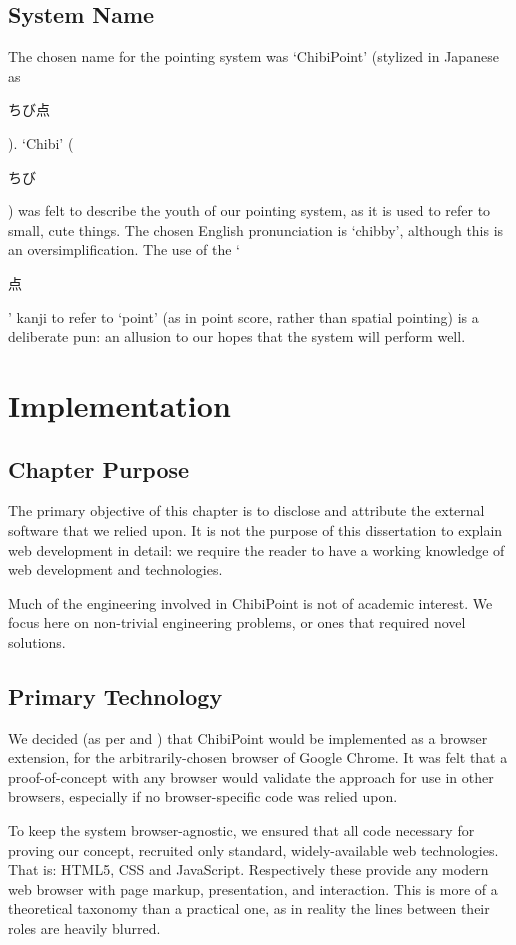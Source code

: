 \documentclass[11pt,openright,a4paper]{report}
\begin{document}
\section{System Name}
The chosen name for the pointing system was `ChibiPoint' (stylized in Japanese as \begin{CJK}{UTF8}{min}ちび点\end{CJK}). `Chibi' (\begin{CJK}{UTF8}{min}ちび\end{CJK}) was felt to describe the youth of our pointing system, as it is used to refer to small, cute things. The chosen English pronunciation is `chibby', although this is an oversimplification. The use of the `\begin{CJK}{UTF8}{min}点\end{CJK}' kanji to refer to `point' (as in point score, rather than spatial pointing) is a deliberate pun: an allusion to our hopes that the system will perform well.

\chapter{Implementation}
\label{chap:implementation}
\section{Chapter Purpose}
The primary objective of this chapter is to disclose and attribute the external software that we relied upon. It is not the purpose of this dissertation to explain web development in detail: we require the reader to have a working knowledge of web development and technologies.

Much of the engineering involved in ChibiPoint is not of academic interest. We focus here on non-trivial engineering problems, or ones that required novel solutions.

\section{Primary Technology}
We decided (as per  and ) that ChibiPoint would be implemented as a browser extension, for the arbitrarily-chosen browser of Google Chrome. It was felt that a proof-of-concept with any browser would validate the approach for use in other browsers, especially if no browser-specific code was relied upon.

To keep the system browser-agnostic, we ensured that all code necessary for proving our concept, recruited only standard, widely-available web technologies. That is: HTML5, CSS and JavaScript. Respectively these provide any modern web browser with page markup, presentation, and interaction. This is more of a theoretical taxonomy than a practical one, as in reality the lines between their roles are heavily blurred.
\end{document}
